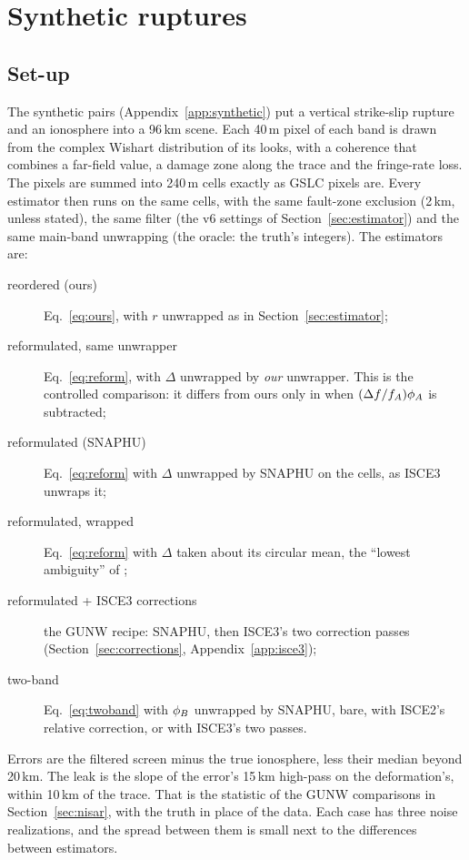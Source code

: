 \section{Synthetic ruptures}
\label{sec:synthetic}

\subsection{Set-up}
The synthetic pairs (Appendix~\ref{app:synthetic}) put a vertical strike-slip rupture and an ionosphere into a 96\,km
scene. Each 40\,m pixel of each band is drawn from the complex Wishart distribution of its looks, with a coherence
that combines a far-field value, a damage zone along the trace and the fringe-rate loss. The pixels are summed into
240\,m cells exactly as GSLC pixels are. Every estimator then runs on the same cells, with the same fault-zone
exclusion (2\,km, unless stated), the same filter (the v6 settings of Section~\ref{sec:estimator}) and the same
main-band unwrapping (the oracle: the truth's integers). The estimators are:
\begin{description}
  \item[reordered (ours)] Eq.~\eqref{eq:ours}, with $r$ unwrapped as in Section~\ref{sec:estimator};
  \item[reformulated, same unwrapper] Eq.~\eqref{eq:reform}, with $\Delta$ unwrapped by \emph{our} unwrapper. This
        is the controlled comparison: it differs from ours only in when $(\Delta f/f_A)\phi_A$ is subtracted;
  \item[reformulated (SNAPHU)] Eq.~\eqref{eq:reform} with $\Delta$ unwrapped by SNAPHU on the cells, as ISCE3
        unwraps it;
  \item[reformulated, wrapped] Eq.~\eqref{eq:reform} with $\Delta$ taken about its circular mean, the
        ``lowest ambiguity'' of \citet{wegmuller2018reformulating};
  \item[reformulated + ISCE3 corrections] the GUNW recipe: SNAPHU, then ISCE3's two correction passes
        (Section~\ref{sec:corrections}, Appendix~\ref{app:isce3});
  \item[two-band] Eq.~\eqref{eq:twoband} with $\phi_B$ unwrapped by SNAPHU, bare, with ISCE2's relative correction,
        or with ISCE3's two passes.
\end{description}
Errors are the filtered screen minus the true ionosphere, less their median beyond 20\,km. The leak is the slope of
the error's 15\,km high-pass on the deformation's, within 10\,km of the trace. That is the statistic of the GUNW
comparisons in Section~\ref{sec:nisar}, with the truth in place of the data. Each case has three noise realizations,
and the spread between them is small next to the differences between estimators.

